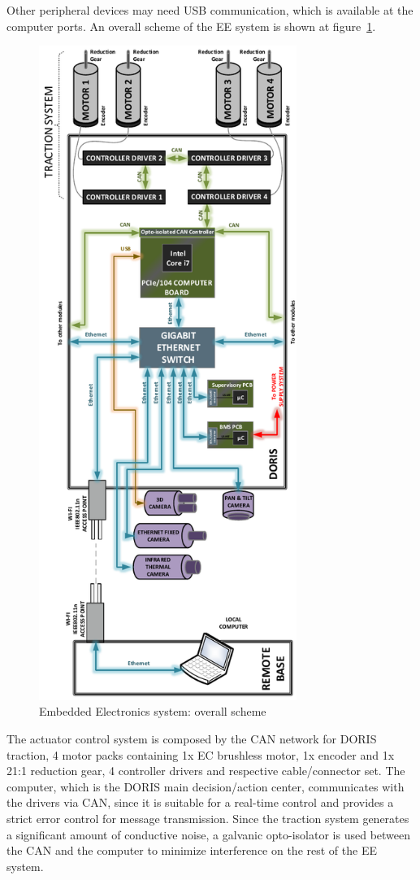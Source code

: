 \documentclass{ifacconf}
\begin{document}
Other peripheral devices may need USB communication, which is available at the
computer ports. An overall scheme of the EE system is shown at
figure~\ref{fig:EE-Communications}.
\begin{figure}
\begin{center}
\includegraphics[width=8.4cm]{figs/EE-Communications.pdf}    %
\caption{Embedded Electronics system: overall scheme}
\label{fig:EE-Communications}
\end{center}
\end{figure}

The actuator control system is composed by the CAN network for DORIS
traction, 4 motor packs containing 1x EC brushless motor, 1x encoder and 1x
21:1 reduction gear, 4 controller drivers and respective cable/connector set.
The computer, which is the DORIS main decision/action center, communicates with
the drivers via CAN, since it is suitable for a real-time control and provides
a strict error control for message transmission. Since the traction system
generates a significant amount of conductive noise, a galvanic opto-isolator is
used between the CAN and the computer to minimize interference on the rest of
the EE system.
\end{document}
